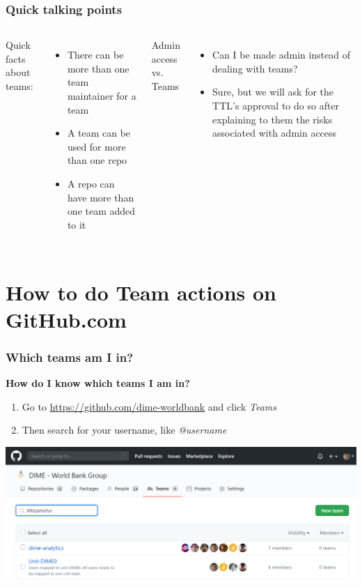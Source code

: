 \documentclass[aspectratio=169]{beamer} %
\begin{document}
\begin{frame}
	\frametitle{Quick talking points}
	
	\begin{columns}[c]
		
		Quick facts about teams:
		\begin{itemize}
			\item There can be more than one team maintainer for a team
			\item A team can be used for more than one repo
			\item A repo can have more than one team added to it
		\end{itemize}
		
		Admin access vs. Teams
		\begin{itemize}
			\item Can I be made admin instead of dealing with teams?
			\item Sure, but we will ask for the TTL's approval to do so after explaining to them the risks associated with admin access
		\end{itemize}	
		
	\end{columns}
\end{frame}


\section{How to do Team actions on GitHub.com}

\begin{frame}
	\frametitle{Which teams am I in?}
	\textbf{How do I know which teams I am in?}
	\begin{enumerate}
		\item Go to \url{https://github.com/dime-worldbank} and click \textit{Teams}
		\item Then search for your username, like \textit{@username}
	\end{enumerate}
	\centering
	\includegraphics[width=.8\linewidth]{./img/which-teams-am-i-in}
\end{frame}
\end{document}
